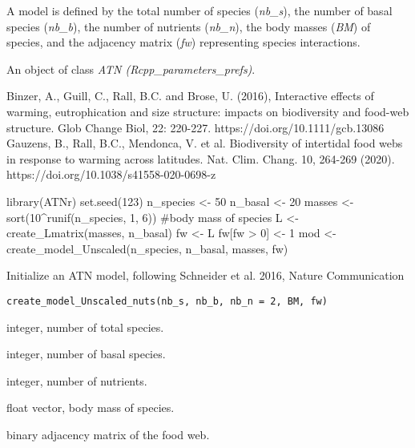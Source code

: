 \documentclass[letterpaper]{book}
\begin{document}
%
\begin{Details}\relax
A model is defined by the total number of species
(\emph{nb\_s}), the number of basal species (\emph{nb\_b}),
the number of nutrients (\emph{nb\_n}), the body masses
(\emph{BM}) of species, and the adjacency matrix (\emph{fw})
representing species interactions.
\end{Details}
%
\begin{Value}
An object of class \emph{ATN (Rcpp\_parameters\_prefs)}.
\end{Value}
%
\begin{References}\relax


Binzer, A., Guill, C., Rall, B.C. and Brose, U. (2016),
Interactive effects of warming, eutrophication and size structure: impacts on biodiversity and food-web structure.
Glob Change Biol, 22: 220-227. https://doi.org/10.1111/gcb.13086
Gauzens, B., Rall, B.C., Mendonca, V. et al.
Biodiversity of intertidal food webs in response to warming across latitudes.
Nat. Clim. Chang. 10, 264-269 (2020). https://doi.org/10.1038/s41558-020-0698-z
\end{References}
%
\begin{Examples}
\begin{ExampleCode}
library(ATNr)
set.seed(123)
n_species <- 50
n_basal <- 20
masses <- sort(10^runif(n_species, 1, 6)) #body mass of species
L <- create_Lmatrix(masses, n_basal)
fw <- L
fw[fw > 0] <- 1
mod <- create_model_Unscaled(n_species, n_basal, masses, fw)
\end{ExampleCode}
\end{Examples}
%
\begin{Description}\relax
Initialize an ATN model, following Schneider et al. 2016, Nature Communication
\end{Description}
%
\begin{Usage}
\begin{verbatim}
create_model_Unscaled_nuts(nb_s, nb_b, nb_n = 2, BM, fw)
\end{verbatim}
\end{Usage}
%
\begin{Arguments}
\begin{ldescription}
\item[\code{nb\_s}] integer, number of total species.

\item[\code{nb\_b}] integer, number of basal species.

\item[\code{nb\_n}] integer, number of nutrients.

\item[\code{BM}] float vector, body mass of species.

\item[\code{fw}] binary adjacency matrix of the food web.
\end{ldescription}
\end{Arguments}
\end{document}
